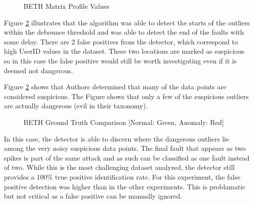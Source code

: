 \begin{figure}[H]
    
    \caption{BETH Matrix Profile Values}
    \label{fig:beth_mp_hist}
\end{figure}

Figure \ref{fig:beth_detection_results} illustrates that the algorithm was able to detect the starts of the outliers within the debounce threshold and was able to detect the end of the faults with some delay. There are 2 false positives from the detector, which correspond to high UserID values in the dataset. These two locations are marked as suspicious so in this case the false positive would still be worth investigating even if it is deemed not dangerous.

Figure \ref{fig:beth_detection_results} shows that Authors \cite{beth-dataset} determined that many of the data points are considered suspicious. The Figure shows that only a few of the suspicious outliers are actually dangerous (evil in their taxonomy). 

\begin{figure}[H]
    
    \caption{BETH Ground Truth Comparison [Normal: Green, Anomaly: Red]}
    \label{fig:beth_detection_results}
\end{figure}

In this case, the detector is able to discern where the dangerous outliers lie among the very noisy suspicious data points. The final fault that appears as two spikes is part of the same attack and as such can be classified as one fault instead of two. While this is the most challenging dataset analyzed, the detector still provides a 100\% true positive identification rate. For this experiment, the false positive detection was higher than in the other experiments. This is problamatic but not critical as a false positive can be manually ignored.
